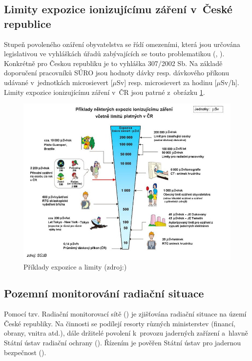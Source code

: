 \subsection{Limity expozice ionizujícímu záření v~České republice}
\label{sub:limity} Stupeň povoleného ozáření obyvatelstva se řídí
omezeními, která jsou určována legislativou ve vyhláškách úřadů
zabývajících se touto problematikou (, ). Konkrétně
pro Českou republiku je to vyhláška 307/2002 Sb. Na základě doporučení
pracovníků SÚRO jsou hodnoty dávky resp. dávkového příkonu udávané
v~jednotkách microsievert [$\mu$Sv] resp. microsievert za hodinu
[$\mu$Sv/h]. Limity expozice ionizujícímu záření v~ČR jsou patrné
z~obrázku \ref{fig:davkyCR}. \cite{suroPriRadOch}

\begin{figure}[H] \centering
    \includegraphics[scale=0.6]{./pictures/davkyCR.jpeg}
      	\caption[Příklady expozice a limity]{Příklady expozice a
limity (zdroj:\cite{suroOcek})}
    	\label{fig:davkyCR}
\end{figure}

\subsection{Pozemní monitorování radiační situace} Pomocí
tzv. Radiační monitorovací sítě () je zjišťována radiační
situace na území České republiky. Na činnosti  se podílejí
resorty různých ministerstev (financí, obrany, vnitra atd.), dále
držitelé povolení k~provozu jaderných zařízení a~hlavně Státní ústav
radiační ochrany (). Řízením je pověřen Státní ústav pro
jadernou bezpečnost (). \cite{suroRMS}

